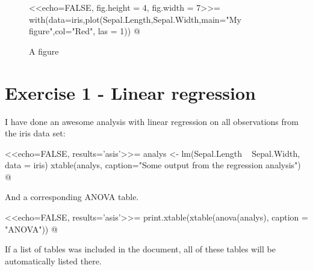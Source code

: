\documentclass[10pt,swedish, openany]{book}
\begin{document}
\begin{figure}[H]
    \centering
    <<echo=FALSE, fig.height = 4, fig.width = 7>>=
    with(data=iris,plot(Sepal.Length,Sepal.Width,main="My figure",col="Red", las = 1))
    @
    \caption{A figure} %
    \label{fig:a-figure} %
\end{figure}

\section{Exercise 1 - Linear regression}
I have done an awesome analysis with linear regression on all  observations from the iris data set:

<<echo=FALSE, results='asis'>>=
analys <- lm(Sepal.Length ~ Sepal.Width, data = iris)
xtable(analys, caption="Some output from the regression analysis")
@

And a corresponding ANOVA table.

<<echo=FALSE, results='asis'>>=
print.xtable(xtable(anova(analys), caption = "ANOVA"))
@

If a list of tables was included in the document, all of these tables will be automatically listed there.

\pagebreak




\end{document}
